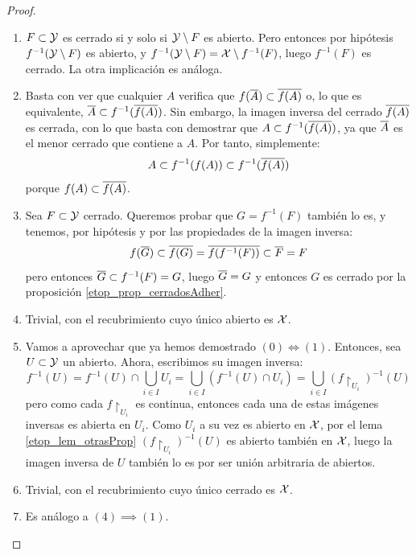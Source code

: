 \begin{prop}
\begin{proof}
\begin{enumerate}[align=left, leftmargin=*]
			\item[\fbox{$(1)\Longleftrightarrow (2)$}] $F\subset\mathcal{Y}$ es cerrado si y solo si $\mathcal{Y}\setminus F$ es abierto. Pero entonces por hipótesis $f^{-1}(\mathcal{Y}\setminus F)$ es abierto, y $f^{-1}(\mathcal{Y}\setminus F)=\mathcal{X}\setminus f^{-1}(F)$, luego $f^{-1}(F)$ es cerrado. La otra implicación es análoga.
			
			\item[\fbox{$(2)\implies (3)$}] Basta con ver que cualquier $A$ verifica que $f(\overline{A})\subset \overline{f(A)}$ o, lo que es equivalente, $\overline{A}\subset f^{-1}(\overline{f(A)})$. Sin embargo, la imagen inversa del cerrado $\overline{f(A)}$ es cerrada, con lo que basta con demostrar que $A\subset f^{-1}(\overline{f(A)})$, ya que $\overline{A}$ es el menor cerrado que contiene a $A$. Por tanto, simplemente:
			\[A\subset f^{-1}(f(A))\subset f^{-1}(\overline{f(A)})\]
			porque $f(A)\subset\overline{f(A)}$.
			
			\item[\fbox{$(3)\implies (2)$}] Sea $F\subset\mathcal{Y}$ cerrado. Queremos probar que $G=f^{-1}(F)$ también lo es, y tenemos, por hipótesis y por las propiedades de la imagen inversa:
			\[f(\overline{G})\subset\overline{f(G)}=\overline{f(f^{-1}(F))}\subset\overline{F}=F\]
			pero entonces $\overline{G}\subset f^{-1}(F)=G$, luego $\overline{G}=G$ y entonces $G$ es cerrado por la proposición \ref{etop_prop_cerradosAdher}.
						
			\item[\fbox{$(0)\implies (4)$}] Trivial, con el recubrimiento cuyo único abierto es $\mathcal{X}$.
			
			\item[\fbox{$(4)\implies (1)$}] Vamos a aprovechar que ya hemos demostrado $(0)\iff (1)$. Entonces, sea $U\subset \mathcal{Y}$ un abierto. Ahora, escribimos su imagen inversa:
			\[f^{-1}(U)=f^{-1}(U)\cap\bigcup\limits_{i\in I} U_i=\bigcup\limits_{i\in I} (f^{-1}(U)\cap U_i)=\bigcup\limits_{i\in I} (f\restriction_{U_i})^{-1}(U)\]
			pero como cada $f\restriction_{U_i}$ es continua, entonces cada una de estas imágenes inversas es abierta en $U_i$. Como $U_i$ a su vez es abierto en $\mathcal{X}$, por el lema \ref{etop_lem_otrasProp} $(f\restriction_{U_i})^{-1}(U)$ es abierto también en $\mathcal{X}$, luego la imagen inversa de $U$ también lo es por ser unión arbitraria de abiertos.
			
			\item[\fbox{$(0)\implies (5)$}] Trivial, con el recubrimiento cuyo único cerrado es $\mathcal{X}$.
			
			\item[\fbox{$(5)\implies (2)$}] Es análogo a $(4)\implies (1)$. \qedhere
		\end{enumerate}
	\end{proof}
\end{prop}


